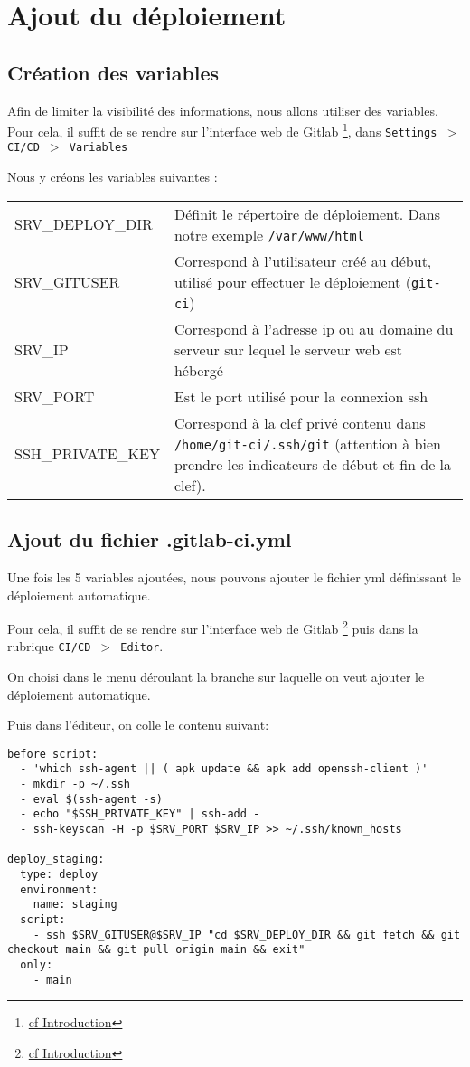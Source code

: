 \section{Ajout du déploiement}
\subsection{Création des variables}
Afin de limiter la visibilité des informations, nous allons utiliser des variables. Pour cela, il suffit de se rendre sur l'interface web de Gitlab \footnote{\hyperref[introduction]{cf Introduction}}, dans \texttt{Settings $>$ CI/CD $>$ Variables}

Nous y créons les variables suivantes :

    \begin{tabular}{l|p{10cm}}
        SRV\_DEPLOY\_DIR & Définit le répertoire de déploiement. Dans notre exemple \texttt{/var/www/html} \\
        SRV\_GITUSER& Correspond à l'utilisateur créé au début, utilisé pour effectuer le déploiement (\texttt{git-ci})\\
        SRV\_IP & Correspond à l'adresse ip ou au domaine du serveur sur lequel le serveur web est hébergé\\
        SRV\_PORT& Est le port utilisé pour la connexion ssh\\
        SSH\_PRIVATE\_KEY & Correspond à la clef privé contenu dans \texttt{/home/git-ci/.ssh/git} (attention à bien prendre les indicateurs de début et fin de la clef).
    \end{tabular}




\subsection{Ajout du fichier .gitlab-ci.yml}
Une fois les 5 variables ajoutées, nous pouvons ajouter le fichier yml définissant le déploiement automatique.

Pour cela, il suffit de se rendre sur l'interface web de Gitlab \footnote{\hyperref[introduction]{cf Introduction}} puis dans la rubrique \texttt{CI/CD $>$ Editor}.

On choisi dans le menu déroulant la branche sur laquelle on veut ajouter le déploiement automatique.

Puis dans l'éditeur, on colle le contenu suivant:

    \begin{verbatim}
before_script:
  - 'which ssh-agent || ( apk update && apk add openssh-client )'
  - mkdir -p ~/.ssh
  - eval $(ssh-agent -s)
  - echo "$SSH_PRIVATE_KEY" | ssh-add -
  - ssh-keyscan -H -p $SRV_PORT $SRV_IP >> ~/.ssh/known_hosts
    
deploy_staging:
  type: deploy
  environment:
    name: staging
  script:
    - ssh $SRV_GITUSER@$SRV_IP "cd $SRV_DEPLOY_DIR && git fetch && git checkout main && git pull origin main && exit"
  only:
    - main
    \end{verbatim}



